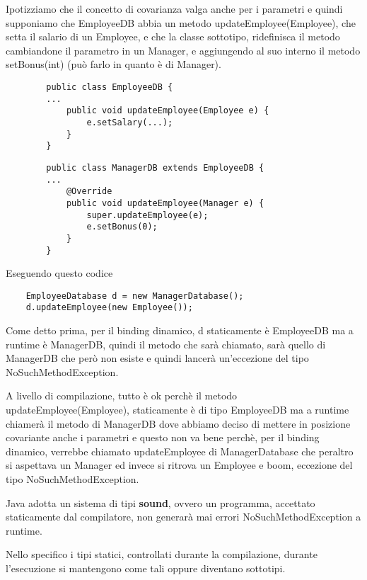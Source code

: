 Ipotizziamo che il concetto di covarianza valga anche per i parametri e quindi supponiamo che EmployeeDB abbia un metodo updateEmployee(Employee), che setta il salario di un Employee, e che la classe sottotipo, ridefinisca il metodo cambiandone il parametro in un Manager,  e aggiungendo al suo interno il metodo setBonus(int) (può farlo in quanto è di Manager).

\begin{multicols}{2}
    \begin{lstlisting}
        public class EmployeeDB {
        ...
            public void updateEmployee(Employee e) {
                e.setSalary(...);
            }
        }
    \end{lstlisting}    
    \columnbreak
    \begin{lstlisting}
        public class ManagerDB extends EmployeeDB {
        ...
            @Override
            public void updateEmployee(Manager e) {
                super.updateEmployee(e);
                e.setBonus(0);
            }
        }
    \end{lstlisting}
\end{multicols}

Eseguendo questo codice

\begin{lstlisting}
    EmployeeDatabase d = new ManagerDatabase();
    d.updateEmployee(new Employee());
\end{lstlisting}

Come detto prima, per il binding dinamico, d staticamente è EmployeeDB ma a runtime è ManagerDB, quindi il metodo che sarà chiamato, sarà quello di ManagerDB che 
però non esiste e quindi lancerà un'eccezione del tipo NoSuchMethodException.

A livello di compilazione, tutto è ok perchè il metodo updateEmployee(Employee), staticamente è di tipo EmployeeDB ma a runtime chiamerà il metodo di ManagerDB 
dove abbiamo deciso di mettere in posizione covariante anche i parametri e questo non va bene perchè, per il binding dinamico, verrebbe chiamato updateEmployee
di ManagerDatabase che peraltro si aspettava un Manager ed invece si ritrova un Employee e boom, eccezione del tipo NoSuchMethodException.

Java adotta un sistema di tipi \textbf{sound}, ovvero un programma, accettato staticamente dal compilatore, non generarà mai errori NoSuchMethodException a runtime.

Nello specifico i tipi statici, controllati durante la compilazione, durante l’esecuzione si mantengono come tali oppure diventano sottotipi.

